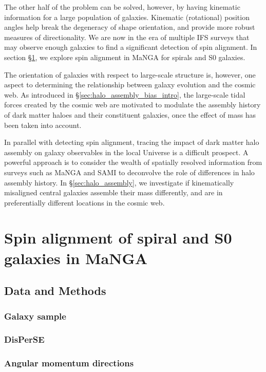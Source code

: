 The other half of the problem can be solved, however, by having kinematic information for a large population of galaxies. Kinematic (rotational) position angles help break the degeneracy of shape orientation, and provide more robust measures of directionality. We are now in the era of multiple IFS surveys that may observe enough galaxies to find a significant detection of spin alignment. In section \S\ref{sec:spin_alignment}, we explore spin alignment in MaNGA for spirals and S0 galaxies.

The orientation of galaxies with respect to large-scale structure is, however, one aspect to determining the relationship between galaxy evolution and the cosmic web. As introduced in \S\ref{sec:halo_assembly_bias_intro}, the large-scale tidal forces created by the cosmic web are motivated to modulate the assembly history of dark matter haloes and their constituent galaxies, once the effect of mass has been taken into account. 

In parallel with detecting spin alignment, tracing the impact of dark matter halo assembly on galaxy observables in the local Universe is a difficult prospect. A powerful approach is to consider the wealth of spatially resolved information from surveys such as MaNGA and SAMI to deconvolve the role of differences in halo assembly history. In \S\ref{sec:halo_assembly}, we investigate if kinematically misaligned central galaxies assemble their mass differently, and are in preferentially different locations in the cosmic web.

\section{Spin alignment of spiral and S0 galaxies in MaNGA} \label{sec:spin_alignment}

\subsection{Data and Methods}
\subsubsection{Galaxy sample}
\subsubsection{DisPerSE}
\subsubsection{Angular momentum directions}

